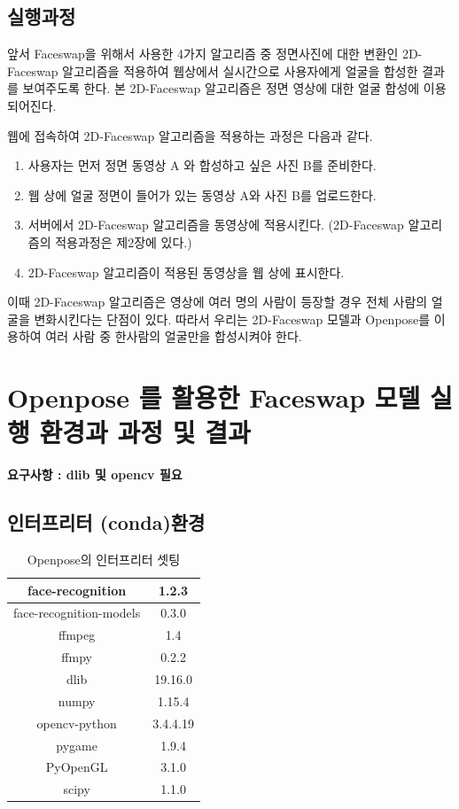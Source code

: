 \documentclass[chapter,oneside]{oblivoir}
\begin{document}
\subsection{실행과정} 

앞서 Faceswap을 위해서 사용한 4가지 알고리즘 중 정면사진에 대한 변환인 2D-Faceswap 알고리즘을 적용하여 웹상에서 실시간으로 사용자에게 얼굴을 합성한 결과를 보여주도록 한다. 본 2D-Faceswap 알고리즘은 정면 영상에 대한 얼굴 합성에 이용되어진다. 

웹에 접속하여 2D-Faceswap 알고리즘을 적용하는 과정은 다음과 같다. 
\begin{enumerate}
    \item  사용자는 먼저 정면 동영상 A 와 합성하고 싶은 사진 B를 준비한다.
    \item 웹 상에 얼굴 정면이 들어가 있는 동영상 A와 사진 B를 업로드한다.
    \item 서버에서 2D-Faceswap 알고리즘을 동영상에 적용시킨다. (2D-Faceswap 알고리즘의 적용과정은 제2장에 있다.)
    \item 2D-Faceswap 알고리즘이 적용된 동영상을 웹 상에 표시한다.
\end{enumerate}

이때 2D-Faceswap 알고리즘은 영상에 여러 명의 사람이 등장할 경우 전체 사람의 얼굴을 변화시킨다는 단점이 있다. 따라서 우리는 2D-Faceswap 모델과 Openpose를 이용하여 여러 사람 중 한사람의 얼굴만을 합성시켜야 한다.



\section{ Openpose 를 활용한 Faceswap 모델 실행 환경과 과정 및 결과}

\textbf{요구사항 :  dlib 및 opencv 필요}

\subsection{인터프리터 (conda)환경}

\begin{table}[h!]
\centering
\begin{tabular}{|c|c|}
    \hline\hline
    face-recognition & 1.2.3\\ \hline
    face-recognition-models & 0.3.0 \\ \hline
    ffmpeg & 1.4 \\ \hline
    ffmpy & 0.2.2 \\ \hline
    dlib & 19.16.0 \\ \hline
    numpy & 1.15.4 \\ \hline
    opencv-python & 3.4.4.19\\ \hline
    pygame & 1.9.4 \\ \hline
    PyOpenGL & 3.1.0 \\ \hline
    scipy &1.1.0\\ \hline
    \hline\hline
\end{tabular}
\caption{Openpose의 인터프리터 셋팅 }
\end{table}
\end{document}

